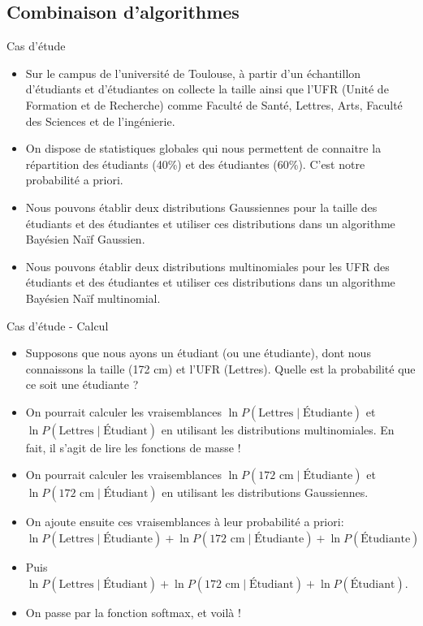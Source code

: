 \documentclass[10pt]{beamer}  %
\begin{document}
\subsection[Combinaison d'algorithmes]{Combinaison d'algorithmes}

\begin{frame}{Cas d'étude}
	\begin{itemize}
		\item Sur le campus de l'université de Toulouse, à partir d'un échantillon d'étudiants et d'étudiantes on collecte la taille ainsi que l'UFR (Unité de Formation et de Recherche) comme Faculté de Santé, Lettres, Arts, Faculté des Sciences et de l'ingénierie.
		\pause
		\item On dispose de statistiques globales qui nous permettent de connaitre la répartition des étudiants (40\%) et des étudiantes (60\%). C'est notre probabilité a priori.
		\pause
		\item Nous pouvons établir deux distributions Gaussiennes pour la taille des étudiants et des étudiantes et utiliser ces distributions dans un algorithme Bayésien Naïf Gaussien.
		\pause
		\item Nous pouvons établir deux distributions multinomiales pour les UFR des étudiants et des étudiantes et utiliser ces distributions dans un algorithme Bayésien Naïf multinomial.
	\end{itemize}
\end{frame}

\begin{frame}{Cas d'étude - Calcul}
	\begin{itemize}
		\item Supposons que nous ayons un étudiant (ou une étudiante), dont nous connaissons la taille (172 cm) et l'UFR (Lettres). Quelle est la probabilité que ce soit une étudiante ?
		\pause
		\item On pourrait calculer les vraisemblances $\ln P(\text{Lettres} \mid \text{\'Etudiante})$ et $\ln P(\text{Lettres} \mid \text{\'Etudiant})$ en utilisant les distributions multinomiales. En fait, il s'agit de lire les fonctions de masse !
		\pause
		\item On pourrait calculer les vraisemblances $\ln P(\text{172 cm} \mid \text{\'Etudiante})$ et $\ln P(\text{172 cm} \mid \text{\'Etudiant})$ en utilisant les distributions Gaussiennes.
		\pause
		\item On ajoute ensuite ces vraisemblances à leur probabilité a priori: $\ln P(\text{Lettres} \mid \text{\'Etudiante}) + \ln P(\text{172 cm} \mid \text{\'Etudiante}) + \ln P(\text{\'Etudiante})$
		\pause
		\item Puis $\ln P(\text{Lettres} \mid \text{\'Etudiant}) + \ln P(\text{172 cm} \mid \text{\'Etudiant}) + \ln P(\text{\'Etudiant})$. 
		\pause
		\item On passe par la fonction softmax, et voilà !
	\end{itemize}
\end{frame}
\end{document}

